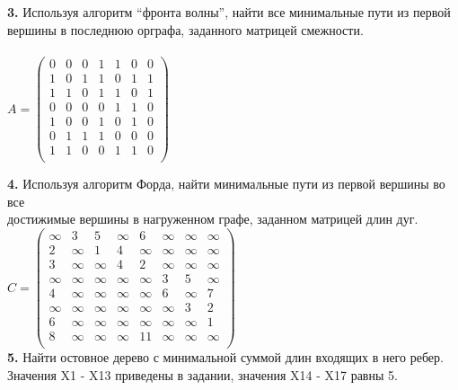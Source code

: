 \documentclass{article}
\begin{document}
\\
\\
\vspace{10mm}
\hspace*{8mm}\textbf{3.} Используя алгоритм “фронта волны”, найти все минимальные пути из первой
\\
\hspace*{12mm} вершины в последнюю орграфа, заданного матрицей смежности.
\vspace{5mm}
\\
\\

\hspace*{40mm}
$A =
	\begin{pmatrix}
		0 & 0 & 0 & 1 & 1 & 0 & 0 \\
		1 & 0 & 1 & 1 & 0 & 1 & 1 \\
		1 & 1 & 0 & 1 & 1 & 0 & 1 \\
		0 & 0 & 0 & 0 & 1 & 1 & 0 \\
		1 & 0 & 0 & 1 & 0 & 1 & 0 \\
		0 & 1 & 1 & 1 & 0 & 0 & 0 \\
		1 & 1 & 0 & 0 & 1 & 1 & 0 \\
	\end{pmatrix}$

\newpage
\hoffset=2mm
\textbf{4.} Используя алгоритм Форда, найти минимальные пути из первой вершины во все
\\ \hspace*{10mm} достижимые вершины в нагруженном графе, заданном матрицей длин дуг.
\vspace{5mm}
\\
\hspace*{40mm}
$C =
	\begin{pmatrix}
		\infty & 3      & 5      & \infty & 6        & \infty & \infty & \infty \\
		2      & \infty & 1      & 4      & \infty   & \infty & \infty & \infty \\
		3      & \infty      & \infty & 4      & 2 & \infty      & \infty & \infty \\
		\infty & \infty & \infty      & \infty & \infty & 3 & 5      & \infty \\
		4      & \infty & \infty & \infty & \infty & 6      & \infty & 7      \\
		\infty & \infty & \infty & \infty & \infty      & \infty & 3      & 2      \\
		6      & \infty & \infty & \infty & \infty & \infty      & \infty & 1      \\
		8      & \infty & \infty & \infty & 11     & \infty & \infty & \infty \\
	\end{pmatrix}$
\vspace{5mm}
\\
\hspace*{4mm} \textbf{5.}  Найти остовное дерево с минимальной суммой длин входящих в него ребер. Значения X1 - X13 приведены в задании, значения X14 - X17 равны 5.
\end{document}
